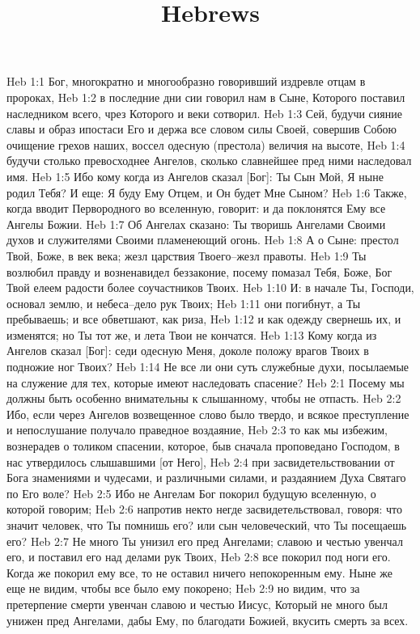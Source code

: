 

\title{Hebrews}

Heb 1:1  Бог, многократно и многообразно говоривший издревле отцам в пророках,
Heb 1:2  в последние дни сии говорил нам в Сыне, Которого поставил наследником всего, чрез Которого и веки сотворил.
Heb 1:3  Сей, будучи сияние славы и образ ипостаси Его и держа все словом силы Своей, совершив Собою очищение грехов наших, воссел одесную (престола) величия на высоте,
Heb 1:4  будучи столько превосходнее Ангелов, сколько славнейшее пред ними наследовал имя.
Heb 1:5  Ибо кому когда из Ангелов сказал [Бог]: Ты Сын Мой, Я ныне родил Тебя? И еще: Я буду Ему Отцем, и Он будет Мне Сыном?
Heb 1:6  Также, когда вводит Первородного во вселенную, говорит: и да поклонятся Ему все Ангелы Божии.
Heb 1:7  Об Ангелах сказано: Ты творишь Ангелами Своими духов и служителями Своими пламенеющий огонь.
Heb 1:8  А о Сыне: престол Твой, Боже, в век века; жезл царствия Твоего--жезл правоты.
Heb 1:9  Ты возлюбил правду и возненавидел беззаконие, посему помазал Тебя, Боже, Бог Твой елеем радости более соучастников Твоих.
Heb 1:10  И: в начале Ты, Господи, основал землю, и небеса--дело рук Твоих;
Heb 1:11  они погибнут, а Ты пребываешь; и все обветшают, как риза,
Heb 1:12  и как одежду свернешь их, и изменятся; но Ты тот же, и лета Твои не кончатся.
Heb 1:13  Кому когда из Ангелов сказал [Бог]: седи одесную Меня, доколе положу врагов Твоих в подножие ног Твоих?
Heb 1:14  Не все ли они суть служебные духи, посылаемые на служение для тех, которые имеют наследовать спасение?
Heb 2:1  Посему мы должны быть особенно внимательны к слышанному, чтобы не отпасть.
Heb 2:2  Ибо, если через Ангелов возвещенное слово было твердо, и всякое преступление и непослушание получало праведное воздаяние,
Heb 2:3  то как мы избежим, вознерадев о толиком спасении, которое, быв сначала проповедано Господом, в нас утвердилось слышавшими [от Него],
Heb 2:4  при засвидетельствовании от Бога знамениями и чудесами, и различными силами, и раздаянием Духа Святаго по Его воле?
Heb 2:5  Ибо не Ангелам Бог покорил будущую вселенную, о которой говорим;
Heb 2:6  напротив некто негде засвидетельствовал, говоря: что значит человек, что Ты помнишь его? или сын человеческий, что Ты посещаешь его?
Heb 2:7  Не много Ты унизил его пред Ангелами; славою и честью увенчал его, и поставил его над делами рук Твоих,
Heb 2:8  все покорил под ноги его. Когда же покорил ему все, то не оставил ничего непокоренным ему. Ныне же еще не видим, чтобы все было ему покорено;
Heb 2:9  но видим, что за претерпение смерти увенчан славою и честью Иисус, Который не много был унижен пред Ангелами, дабы Ему, по благодати Божией, вкусить смерть за всех.
